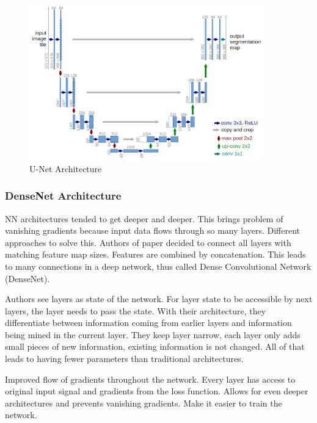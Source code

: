 \begin{figure}[h]
    \centering
    \includegraphics[width=0.9\textwidth]{images/u-net-architecture}
    \caption{U-Net Architecture \cite{unet15}}
    \label{fig:unet_architecture}
\end{figure}

\subsubsection{DenseNet Architecture}
\cite{densenet18}
NN architectures tended to get deeper and deeper. This brings problem of vanishing gradients because input data flows through so many layers. Different approaches to solve this. Authors of paper decided to connect all layers with matching feature map sizes. Features are combined by concatenation. This leads to many connections in a deep network, thus called Dense Convolutional Network (DenseNet).

Authors see layers as state of the network. For layer state to be accessible by next layers, the layer needs to pass the state. With their architecture, they differentiate between information coming from earlier layers and information being mined in the current layer. They keep layer narrow, each layer only adds small pieces of new information, existing information is not changed. All of that leads to having fewer parameters than traditional architectures.

Improved flow of gradients throughout the network. Every layer has access to original input signal and gradients from the loss function. Allows for even deeper architectures and prevents vanishing gradients. Make it easier to train the network.


